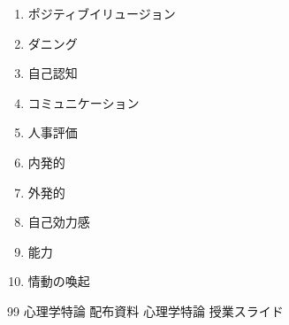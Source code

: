 \documentclass[titlepage,a4paper]{jsarticle}
\begin{document}
\begin{enumerate}
  \item ポジティブイリュージョン
  \item ダニング
  \item 自己認知
  \item コミュニケーション
  \item 人事評価


  \item 内発的
  \item 外発的
  \item 自己効力感
  \item 能力
  \item 情動の喚起
\end{enumerate}
\begin{thebibliography}{99}
\bibitem{} 心理学特論 配布資料
\bibitem{} 心理学特論 授業スライド
\end{thebibliography}
\end{document}
